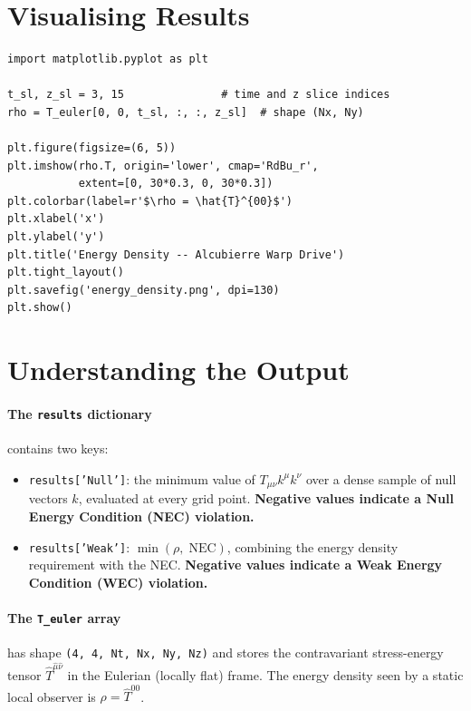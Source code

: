 \documentclass[11pt, a4paper, twoside]{report}
\begin{document}
\section{Visualising Results}

\begin{lstlisting}[caption={Plotting a 2-D slice of the energy density}]
import matplotlib.pyplot as plt

t_sl, z_sl = 3, 15               # time and z slice indices
rho = T_euler[0, 0, t_sl, :, :, z_sl]  # shape (Nx, Ny)

plt.figure(figsize=(6, 5))
plt.imshow(rho.T, origin='lower', cmap='RdBu_r',
           extent=[0, 30*0.3, 0, 30*0.3])
plt.colorbar(label=r'$\rho = \hat{T}^{00}$')
plt.xlabel('x')
plt.ylabel('y')
plt.title('Energy Density -- Alcubierre Warp Drive')
plt.tight_layout()
plt.savefig('energy_density.png', dpi=130)
plt.show()
\end{lstlisting}

\section{Understanding the Output}

\paragraph{The \texttt{results} dictionary} contains two keys:
\begin{itemize}
  \item \texttt{results['Null']}: the minimum value of
        $T_{\mu\nu}k^\mu k^\nu$ over a dense sample of null vectors $k$,
        evaluated at every grid point.  \textbf{Negative values indicate
        a Null Energy Condition (NEC) violation.}
  \item \texttt{results['Weak']}: $\min(\rho,\;\text{NEC})$, combining
        the energy density requirement with the NEC.
        \textbf{Negative values indicate a Weak Energy Condition (WEC)
        violation.}
\end{itemize}

\paragraph{The \texttt{T\_euler} array} has shape
\texttt{(4, 4, Nt, Nx, Ny, Nz)} and stores the contravariant
stress-energy tensor $\hat{T}^{\hat\mu\hat\nu}$ in the Eulerian (locally
flat) frame.  The energy density seen by a static local observer is
$\rho = \hat{T}^{00}$.
\end{document}
